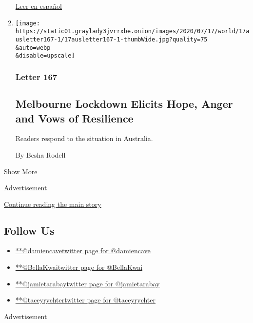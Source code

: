 \begin{enumerate}
  \href{https://www.nytimes3xbfgragh.onion/es/2020/07/24/espanol/ciencia-y-tecnologia/reinfeccion-coronavirus.html}{Leer
  en español}
\item
  \href{/2020/07/17/world/australia/melbourne-lockdown-readers.html}{}

  \texttt{[image: https://static01.graylady3jvrrxbe.onion/images/2020/07/17/world/17ausletter167-1/17ausletter167-1-thumbWide.jpg?quality=75\\\&auto=webp\\\&disable=upscale]}

  \hypertarget{letter-167}{%
  \subsubsection{Letter 167}\label{letter-167}}

  \hypertarget{melbourne-lockdown-elicits-hope-anger-and-vows-of-resilience}{%
  \subsection{Melbourne Lockdown Elicits Hope, Anger and Vows of
  Resilience}\label{melbourne-lockdown-elicits-hope-anger-and-vows-of-resilience}}

  Readers respond to the situation in Australia.

  By Besha Rodell
\end{enumerate}

Show More

Advertisement

\protect\hyperlink{after-mid1}{Continue reading the main story}

\hypertarget{follow-us}{%
\subsection{Follow Us}\label{follow-us}}

\begin{itemize}
\tightlist
\item
  \href{https://twitter.com/damiencave}{**@damiencavetwitter page for
  @damiencave}
\item
  \href{https://twitter.com/BellaKwai}{**@BellaKwaitwitter page for
  @BellaKwai}
\item
  \href{https://twitter.com/jamietarabay}{**@jamietarabaytwitter page
  for @jamietarabay}
\item
  \href{https://twitter.com/taceyrychter}{**@taceyrychtertwitter page
  for @taceyrychter}
\end{itemize}

Advertisement

